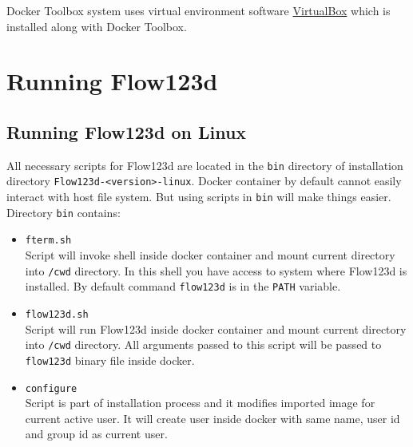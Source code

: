 \documentclass[12pt,a4paper]{report}
\begin{document}
Docker Toolbox system uses virtual environment software \href{https://www.virtualbox.org/}{VirtualBox} which 
is installed along with Docker Toolbox.

\section{Running Flow123d}

\subsection{Running Flow123d on Linux}
\label{subsec:running-flow123d-on-linux}
All necessary scripts for Flow123d are located in the \verb'bin' directory of installation directory \verb'Flow123d-<version>-linux'.
Docker container by default cannot easily interact with host file system. But using scripts in \verb'bin' will make things easier.
Directory \verb'bin' contains:
\begin{itemize}
	\item \verb'fterm.sh' \\
	 Script will invoke shell inside docker container and mount current directory into \verb'/cwd' directory.
	 In this shell you have access to system where Flow123d is installed. By default command \verb'flow123d' is in the \verb'PATH' variable.

	\item \verb'flow123d.sh' \\
	 Script will run Flow123d inside docker container and mount current directory into \verb'/cwd' directory.
	 All arguments passed to this script will be passed to \verb'flow123d' binary file inside docker.
	 
	\item \verb'configure' \\
	 Script is part of installation process and it modifies imported image for current active user. It will create user inside docker
	 with same name, user id and group id as current user.	 	 
\end{itemize}
\end{document}
